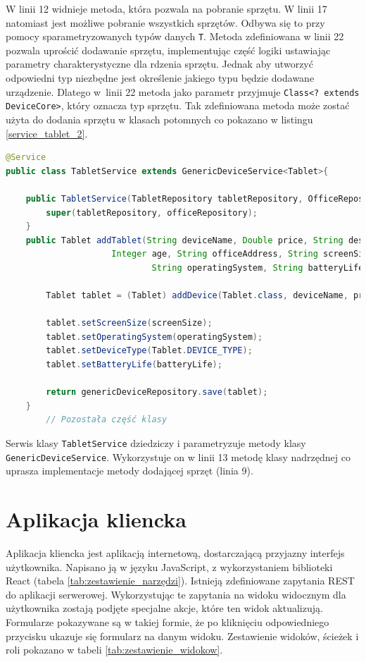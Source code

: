 W linii 12 widnieje metoda, która pozwala na pobranie sprzętu. W linii 17 natomiast jest możliwe pobranie wszystkich sprzętów. Odbywa się to przy pomocy sparametryzowanych typów danych \texttt{T}. Metoda zdefiniowana w linii 22 pozwala uprościć dodawanie sprzętu, implementując część logiki ustawiając parametry charakterystyczne dla rdzenia sprzętu. Jednak aby utworzyć odpowiedni typ niezbędne jest określenie jakiego typu będzie dodawane urządzenie. Dlatego w~linii 22 metoda jako parametr przyjmuje \texttt{Class<? extends DeviceCore>}, który oznacza typ sprzętu. Tak zdefiniowana metoda może zostać użyta do dodania sprzętu w klasach potomnych co pokazano w listingu \ref{service_tablet_2}.

\begin{lstlisting}[language=Java, style=JavaStyle,  caption={Klasa potomna serwisu tabletu: TabletService }, label={service_tablet_2}]
@Service
public class TabletService extends GenericDeviceService<Tablet>{

    public TabletService(TabletRepository tabletRepository, OfficeRepository officeRepository){
        super(tabletRepository, officeRepository);
    }
    public Tablet addTablet(String deviceName, Double price, String description,
                     Integer age, String officeAddress, String screenSize,
                             String operatingSystem, String batteryLife){

        Tablet tablet = (Tablet) addDevice(Tablet.class, deviceName, price, description, age, officeAddress);

        tablet.setScreenSize(screenSize);
        tablet.setOperatingSystem(operatingSystem);
        tablet.setDeviceType(Tablet.DEVICE_TYPE);
        tablet.setBatteryLife(batteryLife);

        return genericDeviceRepository.save(tablet);
    }
		// Pozostała część klasy
\end{lstlisting}

Serwis klasy \texttt{TabletService} dziedziczy i parametryzuje metody klasy \texttt{GenericDeviceService}. Wykorzystuje on w linii 13 metodę klasy nadrzędnej co uprasza implementacje metody dodającej sprzęt (linia 9).

\section {Aplikacja kliencka}
Aplikacja kliencka jest aplikacją internetową, dostarczającą przyjazny interfejs użytkownika. Napisano ją w języku JavaScript, z wykorzystaniem biblioteki React (tabela \ref{tab:zestawienie_narzędzi}). Istnieją zdefiniowane zapytania REST do aplikacji serwerowej. Wykorzystując te zapytania na widoku widocznym dla użytkownika zostają podjęte specjalne akcje, które ten widok aktualizują. Formularze pokazywane są w takiej formie, że po kliknięciu odpowiedniego przycisku ukazuje się formularz na danym widoku. Zestawienie widoków, ścieżek i roli pokazano w tabeli \ref{tab:zestawienie_widokow}.

